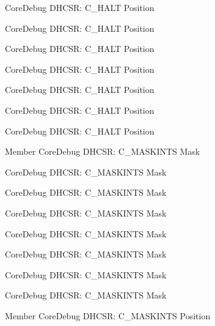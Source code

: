 \begin{DoxyRefList}
\label{deprecated__deprecated000399}%
%
Core\+Debug DHCSR\+: C\+\_\+\+HALT Position 

\label{deprecated__deprecated000323}%
%
Core\+Debug DHCSR\+: C\+\_\+\+HALT Position 

\label{deprecated__deprecated000125}%
%
Core\+Debug DHCSR\+: C\+\_\+\+HALT Position 

\label{deprecated__deprecated000264}%
%
Core\+Debug DHCSR\+: C\+\_\+\+HALT Position 

\label{deprecated__deprecated000590}%
%
Core\+Debug DHCSR\+: C\+\_\+\+HALT Position 

\label{deprecated__deprecated000037}%
%
Core\+Debug DHCSR\+: C\+\_\+\+HALT Position 

\label{deprecated__deprecated000488}%
%
Core\+Debug DHCSR\+: C\+\_\+\+HALT Position  
\item[Member \doxylink{group__CMSIS__CoreDebug_ga77fe1ef3c4a729c1c82fb62a94a51c31}{Core\+Debug\+\_\+\+DHCSR\+\_\+\+C\+\_\+\+MASKINTS\+\_\+\+Msk} ]\label{deprecated__deprecated000034}%
%
Core\+Debug DHCSR\+: C\+\_\+\+MASKINTS Mask 

\label{deprecated__deprecated000396}%
%
Core\+Debug DHCSR\+: C\+\_\+\+MASKINTS Mask 

\label{deprecated__deprecated000178}%
%
Core\+Debug DHCSR\+: C\+\_\+\+MASKINTS Mask 

\label{deprecated__deprecated000320}%
%
Core\+Debug DHCSR\+: C\+\_\+\+MASKINTS Mask 

\label{deprecated__deprecated000122}%
%
Core\+Debug DHCSR\+: C\+\_\+\+MASKINTS Mask 

\label{deprecated__deprecated000261}%
%
Core\+Debug DHCSR\+: C\+\_\+\+MASKINTS Mask 

\label{deprecated__deprecated000485}%
%
Core\+Debug DHCSR\+: C\+\_\+\+MASKINTS Mask 

\label{deprecated__deprecated000587}%
%
Core\+Debug DHCSR\+: C\+\_\+\+MASKINTS Mask  
\item[Member \doxylink{group__CMSIS__CoreDebug_ga0d2907400eb948a4ea3886ca083ec8e3}{Core\+Debug\+\_\+\+DHCSR\+\_\+\+C\+\_\+\+MASKINTS\+\_\+\+Pos} ]\label{deprecated__deprecated000260}%
%
Core\+Debug DHCSR\+: C\+\_\+\+MASKINTS Position 


\end{DoxyRefList}
